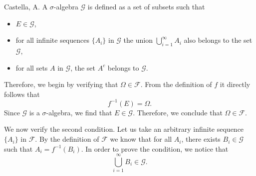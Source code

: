 \begin{solution}[2.4]{Castella, A.}
    A $\sigma$-algebra $\mathcal{G}$ is defined as a set of subsets such that
    \begin{itemize}
        \item $E \in \mathcal{G}$,
        \item for all infinite sequences $\{A_i\}$ in $\mathcal{G}$ the union $\bigcup_{i=1}^\infty A_i$ also belongs to the set $\mathcal{G}$,
        \item for all sets $A$ in $\mathcal{G}$, the set $A^c$ belongs to $\mathcal{G}$.
    \end{itemize}
    Therefore, we begin by verifying that $\Omega \in \mathcal{F}$. From the definition of $f$ it directly follows that
    $$
        f^{-1}(E) = \Omega.
    $$
    Since $\mathcal{G}$ is a $\sigma$-algebra, we find that $E \in \mathcal{G}$. Therefore, we conclude that $\Omega \in \mathcal{F}$.

    We now verify the second condition. Let us take an arbitrary infinite sequence $\{A_i\}$ in $\mathcal{F}$. By the definition of $\mathcal{F}$ we know that for all $A_i$, there exists $B_i \in \mathcal{G}$ such that $A_i = f^{-1}(B_i)$. In order to prove the condition, we notice that
    $$
        \bigcup_{i=1}^\infty B_i \in \mathcal{G}.
    $$


\end{solution}
